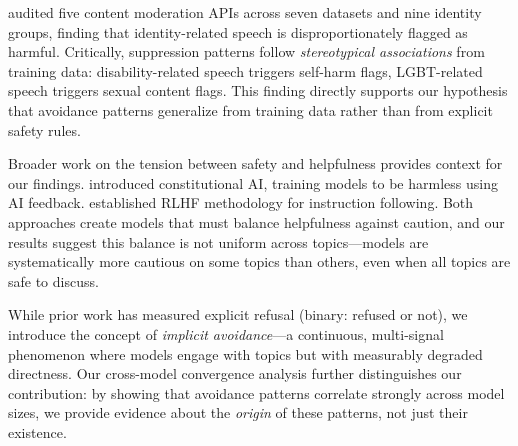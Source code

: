 \citet{proebsting2025speech} audited five content moderation APIs across seven datasets and nine identity groups, finding that identity-related speech is disproportionately flagged as harmful. Critically, suppression patterns follow \emph{stereotypical associations} from training data: disability-related speech triggers self-harm flags, LGBT-related speech triggers sexual content flags. This finding directly supports our hypothesis that avoidance patterns generalize from training data rather than from explicit safety rules.

Broader work on the tension between safety and helpfulness provides context for our findings. \citet{bai2022constitutional} introduced constitutional AI, training models to be harmless using AI feedback. \citet{ouyang2022instructgpt} established RLHF methodology for instruction following. Both approaches create models that must balance helpfulness against caution, and our results suggest this balance is not uniform across topics---models are systematically more cautious on some topics than others, even when all topics are safe to discuss.

While prior work has measured explicit refusal (binary: refused or not), we introduce the concept of \emph{implicit avoidance}---a continuous, multi-signal phenomenon where models engage with topics but with measurably degraded directness. Our cross-model convergence analysis further distinguishes our contribution: by showing that avoidance patterns correlate strongly across model sizes, we provide evidence about the \emph{origin} of these patterns, not just their existence.
